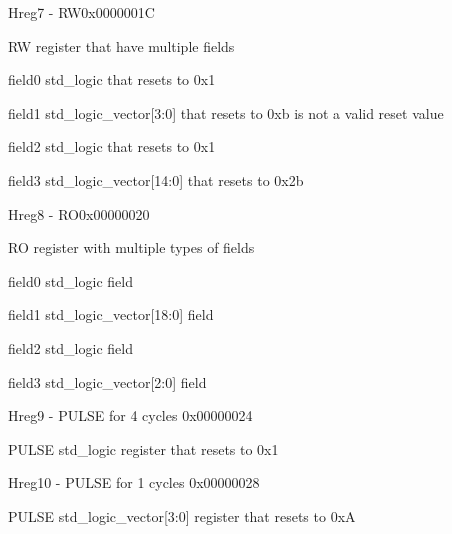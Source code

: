 \documentclass{article}
\begin{document}
\begin{register}{H}{reg7 - RW}{0x0000001C}  \par RW register that have multiple fields \regnewline
  \label{reg7}
\regnewline
  \begin{regdesc}\begin{reglist}[field0]
    \item [field0] std{\_}logic that resets to 0x1    \item [field1] std{\_}logic{\_}vector[3:0] that resets to 0xb is not a valid reset value    \item [field2] std{\_}logic that resets to 0x1    \item [field3] std{\_}logic{\_}vector[14:0] that resets to 0x2b  \end{reglist}\end{regdesc}
\end{register}

\begin{register}{H}{reg8 - RO}{0x00000020}  \par RO register with multiple types of fields \regnewline
  \label{reg8}
\regnewline
  \begin{regdesc}\begin{reglist}[field0]
    \item [field0] std{\_}logic field    \item [field1] std{\_}logic{\_}vector[18:0] field    \item [field2] std{\_}logic field    \item [field3] std{\_}logic{\_}vector[2:0] field  \end{reglist}\end{regdesc}
\end{register}

\begin{register}{H}{reg9 - PULSE for 4 cycles }{0x00000024}  \par PULSE std{\_}logic register that resets to 0x1 \regnewline
  \label{reg9}
\regnewline
\end{register}

\begin{register}{H}{reg10 - PULSE for 1 cycles }{0x00000028}  \par PULSE std{\_}logic{\_}vector[3:0] register that resets to 0xA \regnewline
  \label{reg10}
\regnewline
\end{register}
\end{document}
